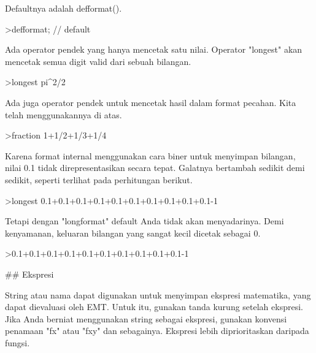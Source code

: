 \documentclass[a4paper,10pt]{article}
\begin{document}
\begin{eulernotebook}
\begin{euleroutput}
  Defaultnya adalah defformat().
  
\end{euleroutput}
\begin{eulerprompt}
>defformat; // default
\end{eulerprompt}
\begin{euleroutput}
  
  Ada operator pendek yang hanya mencetak satu nilai. Operator "longest" akan mencetak semua digit valid dari sebuah bilangan.
  
\end{euleroutput}
\begin{eulerprompt}
>longest pi^2/2
\end{eulerprompt}
\begin{euleroutput}
  
  Ada juga operator pendek untuk mencetak hasil dalam format pecahan. Kita telah menggunakannya di atas.
  
\end{euleroutput}
\begin{eulerprompt}
>fraction 1+1/2+1/3+1/4
\end{eulerprompt}
\begin{euleroutput}
  
  Karena format internal menggunakan cara biner untuk menyimpan bilangan, nilai 0.1 tidak direpresentasikan secara tepat. Galatnya bertambah sedikit demi sedikit, seperti terlihat pada perhitungan berikut.
  
\end{euleroutput}
\begin{eulerprompt}
>longest 0.1+0.1+0.1+0.1+0.1+0.1+0.1+0.1+0.1+0.1-1
\end{eulerprompt}
\begin{euleroutput}
  
  Tetapi dengan "longformat" default Anda tidak akan menyadarinya. Demi kenyamanan, keluaran bilangan yang sangat kecil dicetak sebagai 0.
  
\end{euleroutput}
\begin{eulerprompt}
>0.1+0.1+0.1+0.1+0.1+0.1+0.1+0.1+0.1+0.1-1
\end{eulerprompt}
\begin{euleroutput}
  
  ## Ekspresi
  
  String atau nama dapat digunakan untuk menyimpan ekspresi matematika, yang dapat dievaluasi oleh EMT. Untuk itu, gunakan tanda kurung setelah ekspresi. Jika Anda berniat menggunakan string sebagai ekspresi, gunakan konvensi penamaan "fx" atau "fxy" dan sebagainya. Ekspresi lebih diprioritaskan daripada fungsi.
  

\end{euleroutput}
\end{eulernotebook}
\end{document}
